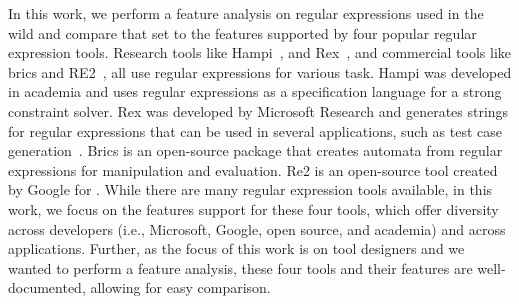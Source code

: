 In this work, we perform a feature analysis on regular expressions used in the wild and compare that set to the features supported by four popular regular expression tools.
Research tools like Hampi~\cite{hampi}, and Rex~\cite{rex}, and commercial tools like brics\cite{brics} and RE2~\cite{re2}, all use regular expressions for various task. Hampi was developed  in academia and uses regular expressions as a specification language for a strong constraint solver. Rex was developed by Microsoft Research and generates strings for regular expressions that can be used in several applications, such as test case generation~\cite{}. Brics is an open-source package that creates automata from regular expressions for manipulation and evaluation.
Re2 is an open-source tool created by Google for .
While there are many regular expression tools available, in this work, we focus on the features support for these four tools, which offer diversity across developers (i.e., Microsoft, Google, open source, and academia) and across applications. Further, as the focus of this work is on tool designers and we wanted to perform a feature analysis, these four tools and their features are well-documented, allowing for easy comparison.






